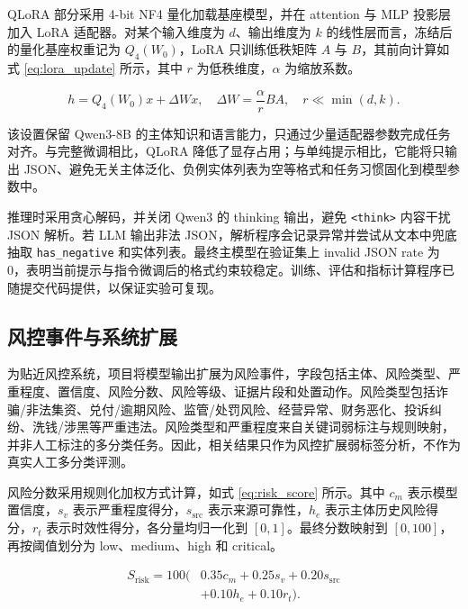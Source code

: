 \documentclass[UTF8,a4paper,12pt]{ctexart}
\begin{document}
QLoRA 部分采用 4-bit NF4 量化加载基座模型，并在 attention 与 MLP 投影层加入 LoRA 适配器。对某个输入维度为 $d$、输出维度为 $k$ 的线性层而言，冻结后的量化基座权重记为 $Q_4(W_0)$，LoRA 只训练低秩矩阵 $A$ 与 $B$，其前向计算如式 \ref{eq:lora_update} 所示，其中 $r$ 为低秩维度，$\alpha$ 为缩放系数。

\begin{equation}
h = Q_4(W_0)x+\Delta Wx,\quad
\Delta W=\frac{\alpha}{r}BA,\quad r\ll \min(d,k).
\label{eq:lora_update}
\end{equation}

该设置保留 Qwen3-8B 的主体知识和语言能力，只通过少量适配器参数完成任务对齐。与完整微调相比，QLoRA 降低了显存占用；与单纯提示相比，它能将只输出 JSON、避免无关主体泛化、负例实体列表为空等格式和任务习惯固化到模型参数中。

推理时采用贪心解码，并关闭 Qwen3 的 thinking 输出，避免 \texttt{<think>} 内容干扰 JSON 解析。若 LLM 输出非法 JSON，解析程序会记录异常并尝试从文本中兜底抽取 \texttt{has\_negative} 和实体列表。最终主模型在验证集上 invalid JSON rate 为 0，表明当前提示与指令微调后的格式约束较稳定。训练、评估和指标计算程序已随提交代码提供，以保证实验可复现。

\subsection{风控事件与系统扩展}

为贴近风控系统，项目将模型输出扩展为风险事件，字段包括主体、风险类型、严重程度、置信度、风险分数、风险等级、证据片段和处置动作。风险类型包括诈骗/非法集资、兑付/逾期风险、监管/处罚风险、经营异常、财务恶化、投诉纠纷、洗钱/涉黑等严重违法。风险类型和严重程度来自关键词弱标注与规则映射，并非人工标注的多分类任务。因此，相关结果只作为风控扩展弱标签分析，不作为真实人工多分类评测。

风险分数采用规则化加权方式计算，如式 \ref{eq:risk_score} 所示。其中 $c_m$ 表示模型置信度，$s_v$ 表示严重程度得分，$s_{\mathrm{src}}$ 表示来源可靠性，$h_e$ 表示主体历史风险得分，$r_t$ 表示时效性得分，各分量均归一化到 $[0,1]$。最终分数映射到 $[0,100]$，再按阈值划分为 low、medium、high 和 critical。

\begin{equation}
\begin{aligned}
S_{\mathrm{risk}}=100(&0.35c_m+0.25s_v+0.20s_{\mathrm{src}}\\
&+0.10h_e+0.10r_t).
\end{aligned}
\label{eq:risk_score}
\end{equation}
\end{document}
